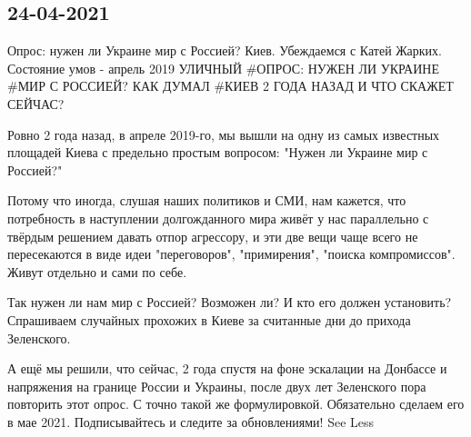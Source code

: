  
 
 
 
 
\subsection{24-04-2021}

Опрос: нужен ли Украине мир с Россией? Киев. Убеждаемся с Катей Жарких. Состояние умов - апрель 2019
УЛИЧНЫЙ #ОПРОС: НУЖЕН ЛИ УКРАИНЕ #МИР С РОССИЕЙ?
КАК ДУМАЛ #КИЕВ 2 ГОДА НАЗАД И ЧТО СКАЖЕТ СЕЙЧАС?

Ровно 2 года назад, в апреле 2019-го, мы вышли на одну из самых известных площадей Киева с предельно простым вопросом: "Нужен ли Украине мир с Россией?"

Потому что иногда, слушая наших политиков и СМИ, нам кажется, что потребность в наступлении долгожданного мира живёт у нас параллельно с твёрдым решением давать отпор агрессору, и эти две вещи чаще всего не пересекаются в виде идеи "переговоров", "примирения", "поиска компромиссов". Живут отдельно и сами по себе.

Так нужен ли нам мир с Россией? Возможен ли? И кто его должен установить? Спрашиваем случайных прохожих в Киеве за считанные дни до прихода Зеленского.

А ещё мы решили, что сейчас, 2 года спустя на фоне эскалации на Донбассе и напряжения на границе России и Украины, после двух лет Зеленского пора повторить этот опрос. С точно такой же формулировкой.
Обязательно сделаем его в мае 2021. Подписывайтесь и следите за обновлениями! See Less
